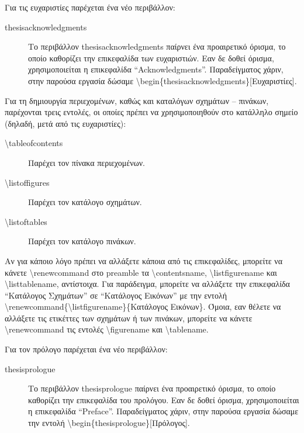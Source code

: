 \documentclass[english]{dithesis} %
\begin{document}
Για τις ευχαριστίες παρέχεται ένα νέο περιβάλλον:
\begin{description}
\item[thesisacknowledgments]
  Το περιβάλλον thesisacknowledgments παίρνει ένα προαιρετικό όρισμα, το οποίο
  καθορίζει την επικεφαλίδα των ευχαριστιών.
  Εαν δε δοθεί όρισμα, χρησιμοποιείται η επικεφαλίδα ``Acknowledgments''.
  Παραδείγματος χάριν, στην παρούσα εργασία δώσαμε
  \textbackslash{begin}\{thesisacknowledgments\}{[Ευχαριστίες]}.
\end{description}

Για τη δημιουργία περιεχομένων, καθώς και καταλόγων σχημάτων -- πινάκων,
παρέχονται τρεις εντολές, οι οποίες πρέπει να χρησιμοποιηθούν στο κατάλληλο
σημείο (δηλαδή, μετά από τις ευχαριστίες):
\begin{description}
\item[\textbackslash{tableofcontents}]
  Παρέχει τον πίνακα περιεχομένων.
\item[\textbackslash{listoffigures}]
  Παρέχει τον κατάλογο σχημάτων.
\item[\textbackslash{listoftables}]
  Παρέχει τον κατάλογο πινάκων.
\end{description}

Αν για κάποιο λόγο πρέπει να αλλάξετε κάποια από τις επικεφαλίδες, μπορείτε να
κάνετε \textbackslash{renewcommand} στο preamble τα
\textbackslash{contentsname}, \textbackslash{listfigurename} και
\textbackslash{listtablename}, αντίστοιχα.
Για παράδειγμα, μπορείτε να αλλάξετε την επικεφαλίδα ``Κατάλογος Σχημάτων'' σε
``Κατάλογος Εικόνων'' με την εντολή
\textbackslash{renewcommand}\{\textbackslash{listfigurename}\}\{Κατάλογος
Εικόνων\}.
Όμοια, εαν θέλετε να αλλάξετε τις ετικέττες των σχημάτων ή των πινάκων, μπορείτε
να κάνετε \textbackslash{renewcommand} τις εντολές \textbackslash{figurename}
και \textbackslash{tablename}.

Για τον πρόλογο παρέχεται ένα νέο περιβάλλον:
\begin{description}
\item[thesisprologue]
  Το περιβάλλον thesisprologue παίρνει ένα προαιρετικό όρισμα, το οποίο
  καθορίζει την επικεφαλίδα του προλόγου.
  Εαν δε δοθεί όρισμα, χρησιμοποιείται η επικεφαλίδα ``Preface''.
  Παραδείγματος χάριν, στην παρούσα εργασία δώσαμε την εντολή
  \textbackslash{begin}\{thesisprologue\}{[Πρόλογος]}.
\end{description}
\end{document}
